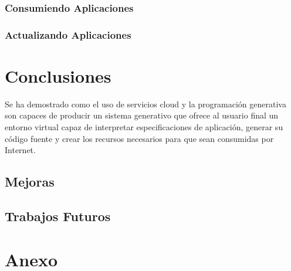 \documentclass[a4paper,11pt]{book}
\begin{document}
\subsection{Consumiendo Aplicaciones}

\subsection{Actualizando Aplicaciones}



\chapter{Conclusiones}

Se ha demostrado como el uso de servicios cloud y la programación generativa son capaces de producir un sistema generativo que ofrece al usuario final un entorno virtual capaz de interpretar especificaciones de aplicación, generar su código fuente y crear los recursos necesarios para que sean consumidas por Internet.   

\section{Mejoras}

\section{Trabajos Futuros}


\chapter{ Anexo}

\thispagestyle{empty}
\end{document}
